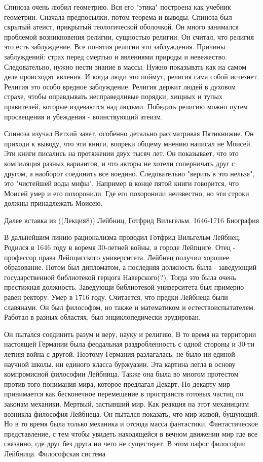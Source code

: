 Спиноза очень любил геометрию. Вся его "этика" построена как учебник геометрии. Сначала предпосылки, потом теорема и выводы. Спиноза был скрытый атеист, прикрытый теологической оболочкой. Он много занимался проблемой возникновения религии, сущностью религии. Он считал, что религия это есть заблуждение. Все понятия религии это заблуждения. Причины заблуждений: страх перед смертью и явлениями природы и невежество. Следовательно, нужно нести знание в массы. Нужно показывать как на самом деле происходят явления. И когда люди это поймут, религия сама собой исчезнет. Религия это особо вредное заблуждение. Религия держит людей в духовом страхе, чтобы оправдывать несправедливые порядки, хищных и тупых правителей, которые издеваются над людьми. Победить религию можно путем просвещения и убеждения - воинствующий атеизм.

Спиноза изучал Ветхий завет, особенно детально рассматривая Пятикнижие. Он приходи к выводу, что эти книги, вопреки общему мнению написал не Моисей. Эти книги писались на протяжении двух тысяч лет. Он показывает, что это компиляция разных вариантов, и что авторы не хотели соперничать друг с другом, а наоборот соединить все воедино. Следовательно "верить в это нельзя", это "чистейшей воды мифы". Например в конце пятой книги говорится, что Моисей умер и его похоронили. Где его похоронили неизвестно, но эти строки должны принадлежать Моисею.

Далее вставка из ((Лекция8))
Лейбниц, Готфрид Вильгельм. 1646-1716
Биография

В дальнейшим линию рационализма проводил Готфрид Вильгельм Лейбнец. Родился в 1646 году в воремя 30-летней войны, в городе Лейпциге. Отец - профессор права Лейпцигского университета. Лейбнец получил хорошее образование. Потом был дипломатом, а последняя должность была - заведующий государственной библиотекой герцога Наверского(?). Тогда это была очень престижная должность. Заведующи библиотекой университета был примерно равен ректору. Умер в 1716 году. Считается, что предки Лейбнеца были славянами. Он был философом, но также и математиком и естествоиспытателем. Работал в разных областях, был энциклопедически эрудирован.

Он пытался соединить разум и веру, науку и религию. В то время на территории настоящей Германии была феодальная раздробленность с одной стороны и 30-ти летняя война с другой. Поэтому Германия разлагалась, не было ни единой научной школы, ни единого класса буржуазии. Эта картина легла в основу компромисной философии Лейбница. Также она была во многом протестом против того понимания мира, которое предлагал Декарт. По декарту мир принимается как бесконечное перемещение в пространств готовых частиц по законам механики. Мертвый, застывший мир. Как реакция на этот механицизм возникла философия Лейбнеца. Он пытался показать, что мир живой, бушующий. Но в то время была только механика и отсюда масса фантастики. Фантастическое представление, с тем чтобы увидеть находящейся в вечном движении мир где все связанно, где друг без друга ни чего не существует. В этом пафос философии Лейбница.
Философская система

